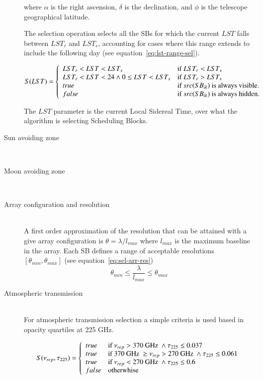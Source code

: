 \begin{description}
where $\alpha$ is the right ascension, $\delta$ is the declination, and
$\phi$ is the telescope geographical latitude.


The selection operation selects all the SBs for which the current $LST$ falls
between $LST_r$ and $LST_s$, accounting for cases where this range extends to include
the following day (see equation~\ref{eq:lst-range-sel}).

\begin{equation}
\label{eq:lst-range-sel}
S(LST) = \left\{ 
	\begin{array}{l l}
	LST_r < LST < LST_s & \mbox{if } LST_r < LST_s \\
	LST_r < LST < 24 \land 0 \leq LST < LST_s & \mbox{if } LST_r > LST_s  \\
	true & \mbox{if } src(SB_{ik}) \mbox{ is always visible.} \\
	false & \mbox{if } src(SB_{ik}) \mbox{ is always hidden.} \\
	\end{array} \right .
\end{equation}

The $LST$ parameter is the current Local Sidereal Time, over what the algorithm is selecting Scheduling Blocks.

\item[Sun avoiding zone] \hfill \\

\item[Moon avoiding zone] \hfill \\

\item[Array configuration and resolution] \hfill \\
A first order approximation of the resolution that can be attained with a give
array configuration is $\theta = \lambda / l_{max}$ where $l_{max}$ is the maximum
baseline in the array. Each SB defines a range of acceptable resolutions $[\theta_{min}, \theta_{max}]$ (see equation~\ref{eq:sel-arr-res})
\begin{equation}
\label{eq:sel-arr-res}
\theta_{min} \leq \frac{\lambda}{l_{max}} \leq \theta_{max}
\end{equation}

\item[Atmospheric transmission] \hfill \\
For atmospheric transmission selection a simple criteria is used based in opacity quartiles at 225 GHz.

\begin{equation}
S(\nu_{rep}, \tau_{225}) = \left\{
    \begin{array}{l l}
    true & \mbox{if } \nu_{rep} > 370 \mbox{ GHz } \land \tau_{225} \leq 0.037 \\
    true & \mbox{if } 370 \mbox{ GHz } \geq \nu_{rep} > 270 \mbox{ GHz } \land \tau_{225} \leq 0.061 \\
    true & \mbox{if } \nu_{rep} < 270 \mbox{ GHz } \land \tau_{225} \leq 0.6\\
    false & \mbox{otherwhise}
    \end{array} \right . 
\end{equation}


\end{description}
